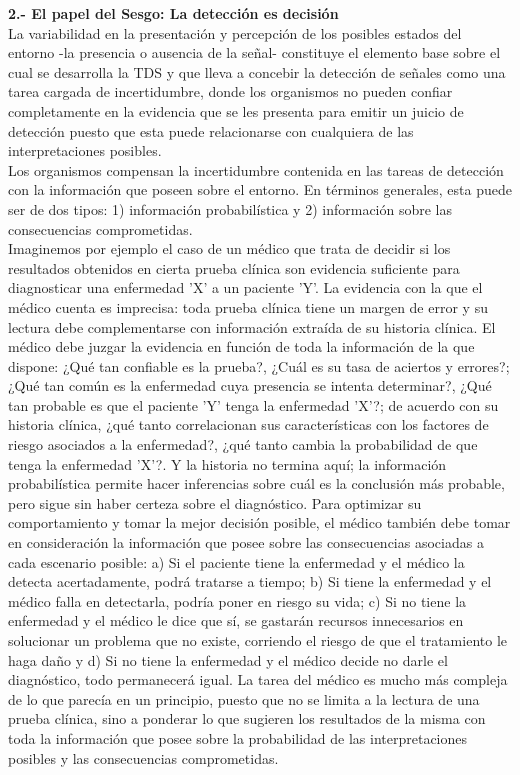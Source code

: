   \textbf{2.- El papel del Sesgo: La detección es decisión}\\

La variabilidad en la presentación y percepción de los posibles estados del entorno -la presencia o ausencia de la señal- constituye el elemento base sobre el cual se desarrolla la TDS y que lleva a concebir la detección de señales como una tarea cargada de incertidumbre, donde los organismos no pueden confiar completamente en la evidencia que se les presenta para emitir un juicio de detección puesto que esta puede relacionarse con cualquiera de las interpretaciones posibles.\\

Los organismos compensan la incertidumbre contenida en las tareas de detección con la información que poseen sobre el entorno. En términos generales, esta puede ser de dos tipos: 1) información probabilística y 2) información sobre las consecuencias comprometidas.\\

Imaginemos por ejemplo el caso de un médico que trata de decidir si los resultados obtenidos en cierta prueba clínica son evidencia suficiente para diagnosticar una enfermedad 'X' a un paciente 'Y'. La evidencia con la que el médico cuenta es imprecisa: toda prueba clínica tiene un margen de error y su lectura debe complementarse con información extraída de su historia clínica. El médico debe juzgar la evidencia en función de toda la información de la que dispone: ¿Qué tan confiable es la prueba?, ¿Cuál es su tasa de aciertos y errores?; ¿Qué tan común es la enfermedad cuya presencia se intenta determinar?, ¿Qué tan probable es que el paciente 'Y' tenga la enfermedad 'X'?; de acuerdo con su historia clínica, ¿qué tanto correlacionan sus características con los factores de riesgo asociados a la enfermedad?, ¿qué tanto cambia la probabilidad de que tenga la enfermedad 'X'?. Y la historia no termina aquí; la información probabilística permite hacer inferencias sobre cuál es la conclusión más probable, pero sigue sin haber certeza sobre el diagnóstico. Para optimizar su comportamiento y tomar la mejor decisión posible, el médico también debe tomar en consideración la información que posee sobre las consecuencias asociadas a cada escenario posible: a) Si el paciente tiene la enfermedad y el médico la detecta acertadamente, podrá tratarse a tiempo; b) Si tiene la enfermedad y el médico falla en detectarla, podría poner en riesgo su vida; c) Si no tiene la enfermedad y el médico le dice que sí, se gastarán recursos innecesarios en solucionar un problema que no existe, corriendo el riesgo de que el tratamiento le haga daño y d) Si no tiene la enfermedad y el médico decide no darle el diagnóstico, todo permanecerá igual. La tarea del médico es mucho más compleja de lo que parecía en un principio, puesto que no se limita a la lectura de una prueba clínica, sino a ponderar lo que sugieren los resultados de la misma con toda la información que posee sobre la probabilidad de las interpretaciones posibles y las consecuencias comprometidas.\\


